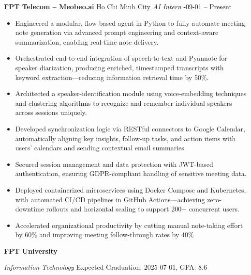 \documentclass[letterpaper, 11pt]{article}
\newcommand{\sectiontitle}[1]{\vspace{0.1in}\noindent{\Large\color{primary} #1}\vspace{0.05in}\hrulefill}
\newcommand{\entry}[4]{
    \vspace{0.02in}
    \noindent\textbf{#1}
    \hfill
    #2
    \newline
    \textit{#3}
    \newline
    #4
}
\begin{document}
\sectiontitle{Experience}
\entry{FPT Telecom -- Meobeo.ai}{Ho Chi Minh City}{AI Intern}{2024-09-01 -- Present}
\begin{itemize}[leftmargin=0.2in]
    \item Engineered a modular, flow-based agent in Python to fully automate meeting-note generation via advanced prompt engineering and context-aware summarization, enabling real-time note delivery.
    \item Orchestrated end-to-end integration of speech-to-text and Pyannote for speaker diarization, producing enriched, timestamped transcripts with keyword extraction---reducing information retrieval time by 50\%.
    \item Architected a speaker-identification module using voice-embedding techniques and clustering algorithms to recognize and remember individual speakers across sessions uniquely.
    \item Developed synchronization logic via RESTful connectors to Google Calendar, automatically aligning key insights, follow-up tasks, and action items with users’ calendars and sending contextual email summaries.
    \item Secured session management and data protection with JWT-based authentication, ensuring GDPR-compliant handling of sensitive meeting data.
    \item Deployed containerized microservices using Docker Compose and Kubernetes, with automated CI/CD pipelines in GitHub Actions---achieving zero-downtime rollouts and horizontal scaling to support 200+ concurrent users.
    \item Accelerated organizational productivity by cutting manual note-taking effort by 60\% and improving meeting follow-through rates by 40\%
\end{itemize}

\sectiontitle{Education}
\entry{FPT University}{}{Information Technology}{Expected Graduation: 2025-07-01, GPA: 8.6}
\end{document}
